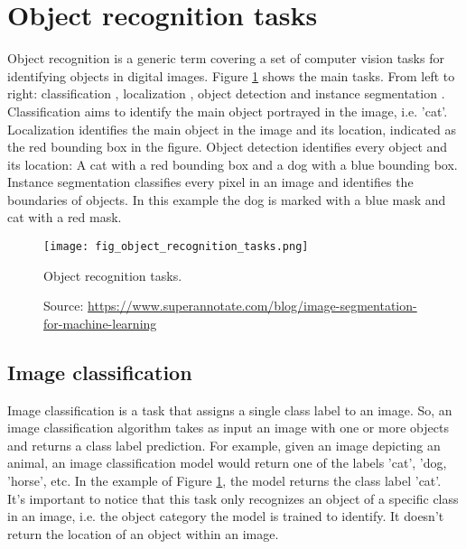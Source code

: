 \section{Object recognition tasks}
Object recognition is a generic term covering a set of computer vision tasks for identifying objects in digital images. Figure \ref{fig:object_recognition_tasks} shows the main tasks. From left to right: classification \cite{lecun1998gradient}, localization \cite{zhou2016cvpr}, object detection \cite{girshick2014rich} and instance segmentation \cite{He_2017_ICCV}. Classification aims to identify the main object portrayed in the image, i.e. 'cat'. Localization identifies the main object in the image and its location, indicated as the red bounding box in the figure. Object detection identifies every object and its location: A cat with a red bounding box and a dog with a blue bounding box. Instance segmentation classifies every pixel in an image and identifies the boundaries of objects. In this example the dog is marked with a blue mask and cat with a red mask.
\begin{figure}[ht]
    \begin{center}
    \texttt{[image: fig\_object\_recognition\_tasks.png]}
    \caption[Object recognition tasks]{
    Object recognition tasks.}
    \caption*{
    Source: \href{https://www.superannotate.com/blog/image-segmentation-for-machine-learning}{https://www.superannotate.com/blog/image-segmentation-for-machine-learning}}
    \label{fig:object_recognition_tasks}
    \end{center}
\end{figure}

\subsection{Image classification}
Image classification is a task that assigns a single class label to an image. So, an image classification algorithm takes as input an image with one or more objects and returns a class label prediction. For example, given an image depicting an animal, an image classification model would return one of the labels 'cat', 'dog, 'horse', etc. In the example of Figure \ref{fig:object_recognition_tasks}, the model returns the class label 'cat'. It's important to notice that this task only recognizes an object of a specific class in an image, i.e. the object category the model is trained to identify. It doesn't return the location of an object within an image.

